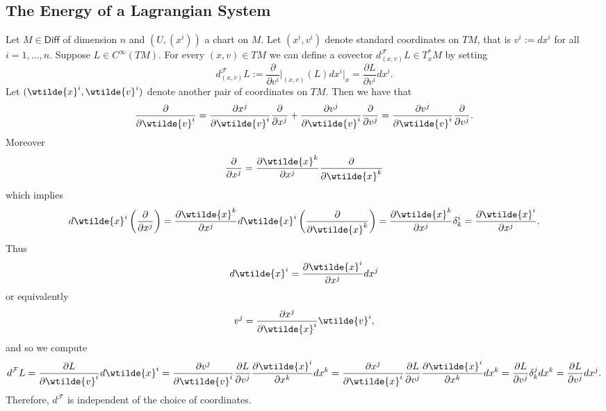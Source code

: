 \subsection*{The Energy of a Lagrangian System}
Let $M \in \mathsf{Diff}$ of dimension $n$ and $(U,(x^i))$ a chart on $M$. Let $(x^i,v^i)$ denote standard coordinates on $TM$, that is $v^i := dx^i$ for all $i = 1,\dots,n$. Suppose $L \in C^\infty(TM)$. For every $(x,v) \in TM$ we can define a covector $d^\mathcal{F}_{(x,v)} L \in T^*_xM$ by setting
\begin{equation}
	d^\mathcal{F}_{(x,v)}L := \frac{\partial}{\partial v^i}\bigg\vert_{(x,v)}(L) dx^i\vert_x = \frac{\partial L}{\partial v^i}dx^i.
\end{equation}
Let $(\wtilde{x}^i,\wtilde{v}^i)$ denote another pair of coordinates on $TM$. Then we have that 
\begin{equation*}
	\frac{\partial}{\partial \wtilde{v}^i} = \frac{\partial x^j}{\partial \wtilde{v}^i}\frac{\partial}{\partial x^j} + \frac{\partial v^j}{\partial \wtilde{v}^i}\frac{\partial}{\partial v^j} = \frac{\partial v^j}{\partial \wtilde{v}^i}\frac{\partial}{\partial v^j}.
\end{equation*}
Moreover
\begin{equation*}
	\frac{\partial}{\partial x^j} = \frac{\partial \wtilde{x}^k}{\partial x^j} \frac{\partial}{\partial \wtilde{x}^k}
\end{equation*}
\noindent which implies
\begin{equation*}
	d\wtilde{x}^i \del[3]{\frac{\partial}{\partial x^j}} = \frac{\partial \wtilde{x}^k}{\partial x^j} d\wtilde{x}^i\del[3]{\frac{\partial}{\partial \wtilde{x}^k}} = \frac{\partial \wtilde{x}^k}{\partial x^j}\delta^i_k = \frac{\partial \wtilde{x}^i}{\partial x^j}.
\end{equation*}
Thus
\begin{equation*}
	d\wtilde{x}^i = \frac{\partial \wtilde{x}^i}{\partial x^j} dx^j
\end{equation*}
\noindent or equivalently 
\begin{equation*}
	v^j = \frac{\partial x^j}{\partial \wtilde{x}^i}\wtilde{v}^i,
\end{equation*}
\noindent and so we compute
\begin{equation*}
	d^\mathcal{F}L = \frac{\partial L}{\partial \wtilde{v}^i}d\wtilde{x}^i = \frac{\partial v^j}{\partial \wtilde{v}^i}\frac{\partial L}{\partial v^j}\frac{\partial \wtilde{x}^i}{\partial x^k} dx^k = \frac{\partial x^j}{\partial \wtilde{x}^i}\frac{\partial L}{\partial v^j}\frac{\partial \wtilde{x}^i}{\partial x^k} dx^k = \frac{\partial L}{\partial v^j}\delta^j_k dx^k = \frac{\partial L}{\partial v^j}dx^j.
\end{equation*}
Therefore, $d^\mathcal{F}$ is independent of the choice of coordinates.

